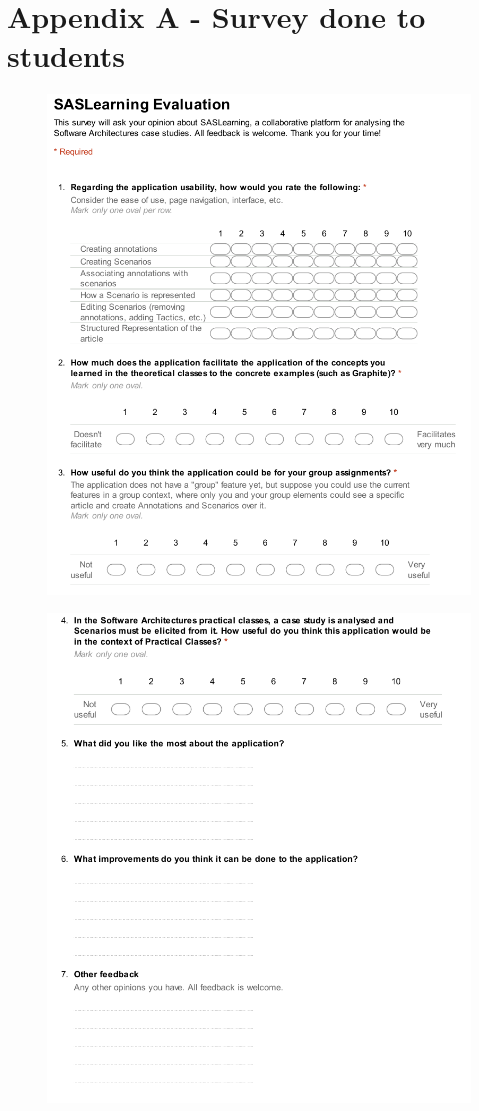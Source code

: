 
\chapter{Appendix A - Survey done to students}
\label{appendix:appendix_a}
\begin{figure}[h]
\centering
\includegraphics[scale=0.6]{images/survey3}
\end{figure}

\begin{figure}
\centering
\includegraphics[scale=0.6]{images/survey4}
\end{figure}
